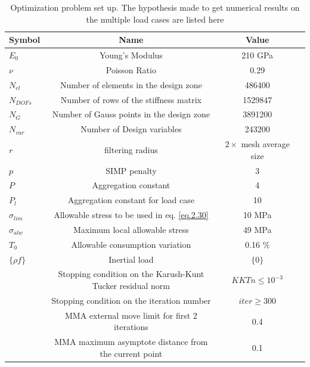   \begin{table}[h]
          \caption{\label{tab:table4} Optimization problem set up. The hypothesis made to get numerical results on the multiple load cases are listed here}
           \centering
           \begin{tabular}{lccc}
           \hline
            Symbol& Name& Value\\\hline
           $E_0$ & Young's Modulus & 210 GPa\\
           $\nu$ & Poisson Ratio& 0.29&\\ $N_{el}$ & Number of elements in the design zone & 486400 \\
           $N_{DOFs}$ & Number of rows of the stiffness matrix & 1529847\\
           $N_G$ & Number of Gauss points in the design zone & 3891200\\
           $N_{var}$ & Number of Design variables & 243200\\
  		$r$ & filtering radius & $2 \times$ mesh average size  \\
  		$p$ & SIMP penalty & 3\\
  		$P$ & Aggregation constant & 4\\  
  		$P_l$ & Aggregation constant for load case& 10\\ 
  		$\sigma_{lim}$ & Allowable stress to be used in eq. \ref{eq.2.30} & 10 MPa\\
  		$\sigma_{alw}$ & Maximum local allowable stress & 49 MPa\\
  		$T_0$ & Allowable consumption variation & 0.16 \% \\
  		$\lbrace\rho f \rbrace$ & Inertial load & $\lbrace 0 \rbrace$ \\
  		 & Stopping condition on the Karush-Kunt Tucker residual norm & $KKTn\leq10^{-3}$\\ 
  		& Stopping condition on the iteration number & $iter \geq 300$ \\
  		& MMA external move limit for first 2 iterations & 0.4 \\
  		& MMA maximum asymptote distance from the current point & 0.1 \\
           \hline
           \end{tabular}
           \end{table}
